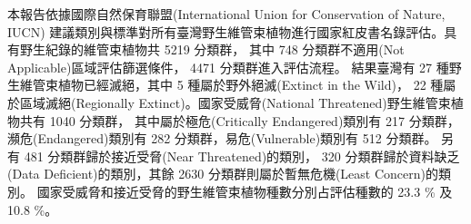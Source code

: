 \noindent 本報告依據國際自然保育聯盟(International Union for Conservation of Nature, IUCN)
建議類別與標準對所有臺灣野生維管束植物進行國家紅皮書名錄評估。具有野生紀錄的維管束植物共 5219 分類群，
其中 748 分類群不適用(Not Applicable)區域評估篩選條件， 4471 分類群進入評估流程。
結果臺灣有 27 種野生維管束植物已經滅絕，其中 5 種屬於野外絕滅(Extinct in the Wild)，
22 種屬於區域滅絕(Regionally Extinct)。國家受威脅(National Threatened)野生維管束植物共有 1040 分類群，
其中屬於極危(Critically Endangered)類別有 217 分類群，
瀕危(Endangered)類別有 282 分類群，易危(Vulnerable)類別有 512 分類群。
另有 481 分類群歸於接近受脅(Near Threatened)的類別，
320 分類群歸於資料缺乏(Data Deficient)的類別，其餘 2630 分類群則屬於暫無危機(Least Concern)的類別。
國家受威脅和接近受脅的野生維管束植物種數分別占評估種數的 23.3 \% 及 10.8 \%。 
